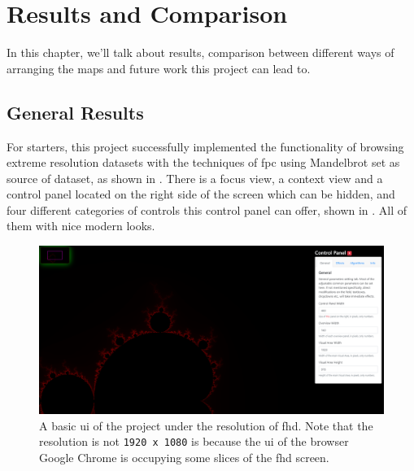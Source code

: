 
\chapter{Results and Comparison} %

\label{Chapter5} %

In this chapter, we'll talk about results, comparison between different ways of arranging the \glspl{map} and future work this project can lead to.


\section{General Results}

For starters, this project successfully implemented the functionality of browsing extreme resolution datasets with the techniques of \gls{fpc} using Mandelbrot set as source of dataset, as shown in . There is a focus view, a context view and a control panel located on the right side of the screen which can be hidden, and four different categories of controls this control panel can offer, shown in . All of them with nice modern looks.

\begin{figure}[H]
\centering
\includegraphics[width=\textwidth,keepaspectratio]{Figures/Chapter5/basic.png}
\decoRule
\caption[Basic UI]{A basic \gls{ui} of the project under the resolution of \gls{fhd}. Note that the resolution is not \texttt{1920 x 1080} is because the \gls{ui} of the browser Google Chrome is occupying some slices of the \gls{fhd} screen.}
\label{fig:chap5:basic}
\end{figure}

